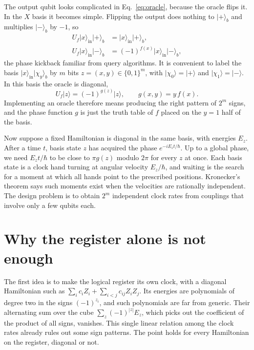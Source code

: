 \documentclass[11pt,a4paper]{article}
\newcommand{\ket}[1]{\lvert #1\rangle}
\begin{document}
The output qubit looks complicated in Eq.~\eqref{eq:oracle}, because the oracle flips it. In the $X$ basis it becomes simple. Flipping the output does nothing to $\ket+_b$ and multiplies $\ket-_b$ by $-1$, so
\begin{equation*}
\begin{aligned}
 U_f\ket{x}_{\mathrm{in}}\ket+_b&=\ket{x}_{\mathrm{in}}\ket+_b,\\
 U_f\ket{x}_{\mathrm{in}}\ket-_b&=(-1)^{f(x)}\ket{x}_{\mathrm{in}}\ket-_b ,
\end{aligned}
\end{equation*}
the phase kickback familiar from query algorithms. It is convenient to label the basis $\ket{x}_{\mathrm{in}}\ket{\chi_y}_b$ by $m$ bits $z=(x,y)\in\{0,1\}^m$, with $\ket{\chi_0}=\ket+$ and $\ket{\chi_1}=\ket-$. In this basis the oracle is diagonal,
\begin{equation}
 U_f\ket{z}=(-1)^{g(z)}\ket{z},\qquad g(x,y)=y\,f(x).
 \label{eq:signs}
\end{equation}
Implementing an oracle therefore means producing the right pattern of $2^m$ signs, and the phase function $g$ is just the truth table of $f$ placed on the $y=1$ half of the basis.

Now suppose a fixed Hamiltonian is diagonal in the same basis, with energies $E_z$. After a time $t$, basis state $z$ has acquired the phase $e^{-iE_zt/\hbar}$. Up to a global phase, we need $E_zt/\hbar$ to be close to $\pi g(z)$ modulo $2\pi$ for every $z$ at once. Each basis state is a clock hand turning at angular velocity $E_z/\hbar$, and waiting is the search for a moment at which all hands point to the prescribed positions. Kronecker's theorem says such moments exist when the velocities are rationally independent. The design problem is to obtain $2^m$ independent clock rates from couplings that involve only a few qubits each.

\section{Why the register alone is not enough}
\label{sec:aux}

The first idea is to make the logical register its own clock, with a diagonal Hamiltonian such as $\sum_ic_iZ_i+\sum_{i<j}c_{ij}Z_iZ_j$. Its energies are polynomials of degree two in the signs $(-1)^{z_i}$, and such polynomials are far from generic. Their alternating sum over the cube $\sum_z(-1)^{|z|}E_z$, which picks out the coefficient of the product of all signs, vanishes. This single linear relation among the clock rates already rules out some sign patterns. The point holds for every Hamiltonian on the register, diagonal or not.
\end{document}

